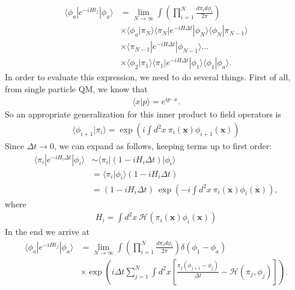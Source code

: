         \begin{align}
            \langle \phi_a| e^{- i H t_f} | \phi_a \rangle &= \lim_{N\rightarrow \infty} \int \left( \prod_{i=1}^{N} \frac{d\pi_i d\phi_i}{2\pi} \right) \nonumber \\
            &\times \langle \phi_a | \pi_N \rangle \langle \pi_N|  e^{-i H \Delta t}| \phi_N \rangle \langle \phi_N | \pi_{N-1} \rangle \nonumber \\
            &\times \langle \pi_{N-1} | e^{-i H \Delta t} | \phi_{N-1} \rangle \dots \nonumber \\
            &\times \langle \phi_2 | \pi_1 \rangle \langle \pi_1 | e^{-i H \Delta t} | \phi_1 \rangle \langle \phi_1 |\phi_a \rangle.
        \end{align}
        In order to evaluate this expression, we need to do several things. First of all, from single particle QM, we know that 
        \begin{align}
            \langle x | p \rangle = e^{i p \cdot x}.
        \end{align}
        So an appropriate generalization for this inner product to field operators is 
        \begin{align}
            \langle \phi_{i+1}| \pi_i \rangle = \exp \left(i \int d^2 x \ \pi_i(\bm{x}) \phi_{i+1}(\bm{x}) \right)
        \end{align}
        Since $\Delta t \rightarrow 0$, we can expand as follows, keeping terms up to first order:
        \begin{align}
            \langle \pi_i | e^{-i H_i \Delta t} | \phi_i \rangle &\sim \langle \pi_i | (1- i H_i \Delta t ) | \phi_i \rangle \nonumber \\
            &= \langle \pi_i | \phi_i \rangle (1 - i H_i \Delta t) \nonumber \\
            & = (1-i H_i \Delta t) \ \exp\left(-i \int d^2x \, \pi_i(\bm{x}) \phi_i (\bm{x})  \right),
        \end{align}
        where
        \begin{align}
            H_i = \int d^2 x \ \mathcal{H}\left(\pi_i (\bm{x}) \phi_i (\bm{x}) \right)
        \end{align}
        In the end we arrive at 
        \begin{align}
            \langle \phi_a | e^{-i H t_f} | \phi_a \rangle &= \lim_{N\rightarrow \infty} \int \left( \prod_{i=1}^N \frac{d \pi_i d\phi_i}{2\pi} \right) \delta \left(\phi_1 -\phi_a \right) \nonumber \\
            &\times \exp \left(i \Delta t \sum_{j=1}^{N} \int d^2x \left[\frac{\pi_j (\phi_{j+1} -\phi_j)}{\Delta t} - \mathcal{H}(\pi_j, \phi_j) \right] \right).
        \end{align}
